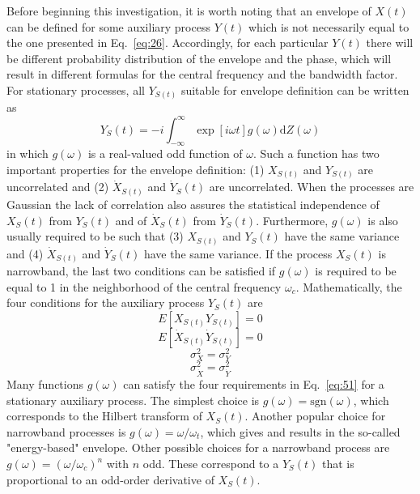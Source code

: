 \documentclass{article}
\begin{document}
Before beginning this investigation, it is worth noting that an envelope of $X
(t)$ can be defined for some auxiliary process $Y (t)$ which is not
necessarily equal to the one presented in Eq.~\eqref{eq:26}. Accordingly, for
each particular $Y (t)$ there will be different probability distribution of
the envelope and the phase, which will result in different formulas for the
central frequency and the bandwidth factor. For stationary processes, all
$Y_{S (t)}$ suitable for envelope definition can be written
as~{\cite{LutesSarkani1997}}
\begin{equation}
  Y_S (t) = - i \int_{- \infty}^{\infty} \exp [i \omega t] g (\omega)
  \mathrm{d} Z (\omega) \label{eq:50}
\end{equation}
in which $g (\omega)$ is a real-valued odd function of $\omega$. Such a
function has two important properties for the envelope definition: (1) $X_{S
(t)}$ and $Y_{S (t)}$ are uncorrelated and (2) $\dot{X}_{S (t)}$ and
$\dot{Y}_S (t)$ are uncorrelated. When the processes are Gaussian the lack of
correlation also assures the statistical independence of $X_S (t)$ from $Y_S
(t)$ and of $\dot{X}_S (t)$ from $\dot{Y}_S (t)$. Furthermore, $g (\omega)$ is
also usually required to be such that (3) $X_{S (t)}$ and $Y_S (t)$ have the
same variance and (4) $\dot{X}_{S (t)}$ and $\dot{Y}_S (t)$ have the same
variance. If the process $X_S (t)$ is narrowband, the last two conditions can
be satisfied if $g (\omega)$ is required to be equal to 1 in the neighborhood
of the central frequency $\omega_c$. Mathematically, the four conditions for
the auxiliary process $Y_S (t)$ are
\begin{equation}
  E [X_{S (t)} Y_{S (t)}] = 0
\end{equation}
\begin{equation}
  E [\dot{X}_{S (t)} \dot{Y}_{S (t)}] = 0 \label{eq:51}
\end{equation}
\begin{equation}
  \sigma_X^2 = \sigma_Y^2
\end{equation}
\begin{equation}
  \sigma_{\dot{X}}^2 = \sigma_{\dot{Y}}^2
\end{equation}
Many functions $g (\omega)$ can satisfy the four requirements in
Eq.~\eqref{eq:51} for a stationary auxiliary process. The simplest choice is
$g (\omega) = \mathrm{sgn} (\omega)$, which corresponds to the Hilbert
transform of $X_S (t)$. Another popular choice for narrowband processes is $g
(\omega) = \omega / \omega_t$, which gives and results in the so-called
"energy-based" envelope. Other possible choices for a narrowband process are
$g (\omega) = (\omega / \omega_c)^n$ with $n$ odd. These correspond to a $Y_S
(t)$ that is proportional to an odd-order derivative of $X_S (t)$.
\end{document}
